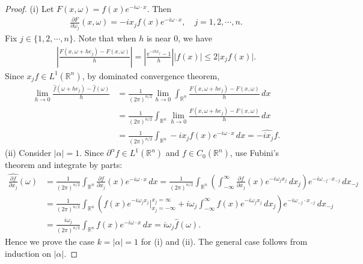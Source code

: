\documentclass{article}
\numberwithin{equation}{section}
\newcommand{\e}{\mathrm{e}}
\newcommand{\bbR}{\mathbb{R}}
\newcommand{\wh}{\widehat}
\theoremstyle{plain}
\theoremstyle{definition}
\begin{document}
\begin{proof}
(i) Let $F(x,\omega)=f(x)e^{-i\omega\cdot x}$. Then
\begin{align*}
	\frac{\partial F}{\partial\omega_j}(x,\omega)=-ix_jf(x)e^{-i\omega\cdot x},\quad j=1,2,\cdots,n.
\end{align*}
Fix $j\in\{1,2,\cdots,n\}$. Note that when $h$ is near $0$, we have
\begin{align*}
	\left\vert\frac{F(x,\omega+he_j)-F(x,\omega)}{h}\right\vert=\left\vert\frac{\e^{-ihx_j}-1}{h}\right\vert\left\vert f(x)\right\vert\leq 2\vert x_jf(x)\vert.
\end{align*}
Since $x_jf\in L^1(\bbR^n)$, by dominated convergence theorem,
\begin{align*}
	\lim_{h\to 0}\frac{\wh{f}(\omega+he_j)-\wh{f}(\omega)}{h}&=\frac{1}{(2\pi)^{n/2}}\lim_{h\to 0}\int_{\bbR^n}\frac{F(x,\omega+he_j)-F(x,\omega)}{h}\,dx\\
	&=\frac{1}{(2\pi)^{n/2}}\int_{\bbR^n}\lim_{h\to 0}\frac{F(x,\omega+he_j)-F(x,\omega)}{h}\,dx\\
	&=\frac{1}{(2\pi)^{n/2}}\int_{\bbR^n}-ix_jf(x)e^{-i\omega\cdot x}\,dx=\wh{-ix_j f}.
\end{align*}
(ii) Consider $\vert\alpha\vert=1$. Since $\partial^\alpha f\in L^1(\bbR^n)$ and $f\in C_0(\bbR^n)$, use Fubini's theorem and integrate by parts:
\begin{align*}
	\wh{\frac{\partial f}{\partial x_j}}(\omega)&=\frac{1}{(2\pi)^{n/2}}\int_{\bbR^n} \frac{\partial f}{\partial x_j}(x)e^{-i\omega\cdot x}\,dx=\frac{1}{(2\pi)^{n/2}}\int_{\bbR^n}\left(\int_{-\infty}^\infty \frac{\partial f}{\partial x_j}(x)e^{-i\omega_j x_j}\,dx_j\right) e^{-i\omega_{-j}\cdot x_{-j}}\,dx_{-j}\\
	&=\frac{1}{(2\pi)^{n/2}}\int_{\bbR^n}\left(f(x)e^{-i\omega_jx_j}\big|_{x_j=-\infty}^{x_j=\infty} +i\omega_j\int_{-\infty}^\infty f(x)e^{-i\omega_j x_j}\,dx_j\right) e^{-i\omega_{-j}\cdot x_{-j}}\,dx_{-j}\\
	&=\frac{i\omega_j}{(2\pi)^{n/2}}\int_{\bbR^n} f(x)e^{-i\omega\cdot x}\,dx=i\omega_j\wh{f}(\omega).
\end{align*}
Hence we prove the case $k=\vert\alpha\vert=1$ for (i) and (ii). The general case follows from induction on $\vert\alpha\vert$.
\end{proof}
\end{document}
